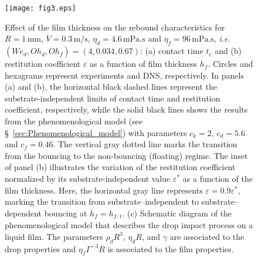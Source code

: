 \documentclass[]{jfm}
\newcommand{\Ohd}{\mathit{Oh}_\mathit{d}}
\newcommand{\Ohf}{\mathit{Oh}_\mathit{f}}
\newcommand{\Wen}{\mathit{We}_\mathit{d}}
\begin{document}
	\begin{figure}
		\centering
		\texttt{[image: fig3.eps]}
		\caption{Effect of the film thickness on the rebound characteristics for $R = 1\,\si{\milli\meter}$, $V = 0.3\,\si{\meter}/\si{\second}$, $\eta_{d} = 4.6\,\si{\milli\pascal}.\si{\second}$ and $\eta_{f} = 96\,\si{\milli\pascal}.\si{\second}$, \emph{i.e.} $(\Wen, \Ohd, \Ohf) = (4, 0.034, 0.67)$: (a) contact time $t_{c}$ and (b) restitution coefficient $\varepsilon$ as a function of film thickness $h_{f}$. Circles and hexagrams represent experiments and DNS, respectively. 
			In panels (a) and (b), the horizontal black dashed lines represent the substrate-independent limits of contact time and restitution coefficient, respectively, while the solid black lines shows the results from the phenomenological model (see \S~\ref{sec:Phenomenological_model}) with parameters $c_{k} = 2$, $c_{d} = 5.6$ and $c_{f} = 0.46$. The vertical gray dotted line marks the transition from the bouncing to the non-bouncing (floating) regime. The inset of panel (b) illustrates the variation of the restitution coefficient normalized by its substrate-independent value $\varepsilon^*$ as a function of the film thickness. Here, the horizontal gray line represents $\varepsilon = 0.9\varepsilon^*$, marking the transition from substrate--independent to substrate--dependent bouncing at $h_f = h_{f, 1}$. (c) Schematic diagram of the phenomenological model that describes the drop impact process on a liquid film. The parameters $\rho_d R^{3}$, $\eta_{d}R$, and $\gamma$ are associated to the drop properties and $\eta_{f} \Gamma^{-3} R$ is associated to the film properties. }
		\label{fig:figure03}
	\end{figure}
	
\end{document}

